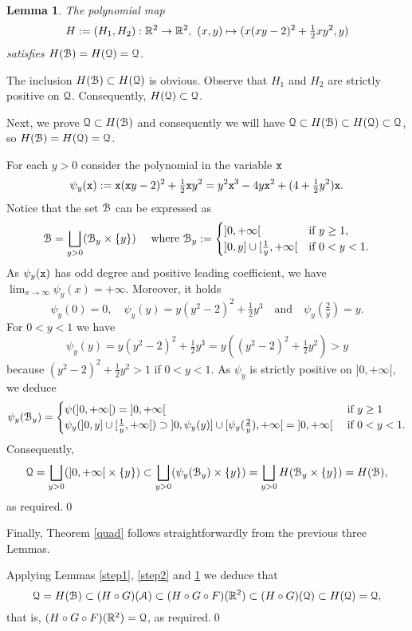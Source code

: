 \documentclass[1p]{elsarticle}
\newtheorem{lem}[thm]{Lemma}
\newcommand{\Qq}{{\EuScript Q}}
\newcommand{\Aa}{{\EuScript A}}
\newcommand{\Bb}{{\EuScript B}}
\newcommand{\x}{{\tt x}} \newcommand{\y}{{\tt y}}
\begin{document}
\begin{lem}\label{step3}
The polynomial map
$$
H:=(H_1,H_2):\R^2\to\R^2,\ (x,y)\mapsto(x(xy-2)^2+\tfrac{1}{2}xy^2,y)
$$
satisfies $H(\Bb)=H(\Qq)=\Qq$.
\end{lem}
\begin{pf}
The inclusion $H(\Bb)\subset H(\Qq)$ is obvious. Observe that $H_1$ and $H_2$ are strictly positive on $\Qq$. Consequently, $H(\Qq)\subset\Qq$.

Next, we prove $\Qq\subset H(\Bb)$ and consequently we will have $\Qq\subset H(\Bb)\subset H(\Qq)\subset \Qq$, so $H(\Bb)=H(\Qq)=\Qq$. 

For each $y>0$ consider the polynomial in the variable $\x$
$$
\psi_y(\x):=\x(\x y-2)^2+\tfrac{1}{2}\x y^2=y^2\x^3-4y\x^2+(4+\tfrac{1}{2}y^2)\x.
$$
Notice that the set $\Bb$ can be expressed as
$$
\Bb=\bigsqcup_{y>0}(\Bb_y\times\{y\})\quad \text{ where }\Bb_y:=\begin{cases}
{]0,+\infty[}& \text{if $y\ge 1$},\\
{]0,y]}\cup{[\tfrac{1}{y},+\infty[}&\text{if $0<y<1$}.
\end{cases}
$$
As $\psi_y(\x)$ has odd degree and positive leading coefficient, we have $\lim_{x\to\infty}\psi_y(x)=+\infty$. Moreover, it holds
$$
\psi_y(0)=0,\quad \psi_y(y)=y(y^2-2)^2+\tfrac{1}{2}y^3\quad\text{and}\quad\psi_y(\tfrac{2}{y})=y.
$$
For $0<y<1$ we have 
$$
\psi_y(y)=y(y^2-2)^2+\tfrac{1}{2}y^3=y((y^2-2)^2+\tfrac{1}{2}y^2)>y
$$ 
because $(y^2-2)^2+\frac{1}{2}y^2>1$ if $0<y<1$. As $\psi_y$ is strictly positive on ${]0,+\infty[}$, we deduce
$$
\psi_y(\Bb_y)=\begin{cases}
\psi({]0,+\infty[})={]0,+\infty[}&\text{ if $y\ge 1$}\\
\psi_y({]0,y]}\cup{[\tfrac{1}{y},+\infty[})\supset{]0,\psi_y(y)]}\cup{[\psi_y(\tfrac{2}{y}),+\infty[}={]0,+\infty[}&\text{ if $0<y<1$}.
\end{cases}
$$
Consequently,
$$
\Qq=\bigsqcup_{y>0}({]0,+\infty[}\times\{y\})\subset\bigsqcup_{y>0}(\psi_y(\Bb_y)\times\{y\})=\bigsqcup_{y>0}H(\Bb_y\times\{y\})=H(\Bb),
$$
as required.\qed
\end{pf}

Finally, Theorem \ref{quad} follows straightforwardly from the previous three Lemmas.

\begin{pot}%
Applying Lemmas \ref{step1}, \ref{step2} and \ref{step3} we deduce that 
$$
\Qq=H(\Bb)\subset(H\circ G)(\Aa)\subset(H\circ G\circ F)(\R^2)\subset(H\circ G)(\Qq)
\subset H(\Qq)=\Qq,
$$
that is, $(H\circ G\circ F)(\R^2)=\Qq$, as required.\qed
\end{pot}
\end{document}
